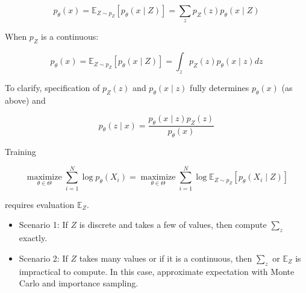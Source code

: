 \begin{definition}
    $$
    p_{\theta}(x)=\mathbb{E}_{Z \sim p_{Z}}\left[p_{\theta}(x \mid Z)\right]=\sum_{z} p_{Z}(z) p_{\theta}(x \mid Z)
    $$

    When $p_{Z}$ is a continuous:

    $$
    p_{\theta}(x)=\mathbb{E}_{Z \sim p_{Z}}\left[p_{\theta}(x \mid Z)\right]=\int_{z} p_{Z}(z) p_{\theta}(x \mid z) d z
    $$

    To clarify, specification of $p_{Z}(z)$ and $p_{\theta}(x \mid z)$ fully determines $p_{\theta}(x)$ (as above) and

    $$
    p_{\theta}(z \mid x)=\frac{p_{\theta}(x \mid z) p_{Z}(z)}{p_{\theta}(x)}
    $$

    \par\noindent\textcolor{gray}{\hdashrule{\textwidth}{0.4pt}{1pt 2pt}}

    Training

    $$
    \underset{\theta \in \Theta}{\operatorname{maximize}} \sum_{i=1}^{N} \log p_{\theta}\left(X_{i}\right)=\underset{\theta \in \Theta}{\operatorname{maximize}} \sum_{i=1}^{N} \log \mathbb{E}_{Z \sim p_{Z}}\left[p_{\theta}\left(X_{i} \mid Z\right)\right]
    $$

    requires evaluation $\mathbb{E}_{Z}$.

    \begin{itemize}
        \item Scenario 1: If $Z$ is discrete and takes a few of values, then compute $\sum_{z}$ exactly.
        \item Scenario 2: If $Z$ takes many values or if it is a continuous, then $\sum_{z}$ or $\mathbb{E}_{Z}$ is impractical to compute. In this case, approximate expectation with Monte Carlo and importance sampling.
    \end{itemize}
\end{definition}

